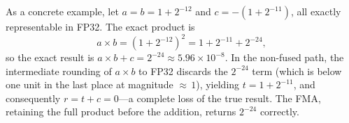 As a concrete example, let $a = b = 1 + 2^{-12}$ and $c = -(1 + 2^{-11})$, all exactly representable in FP32. The exact product is
\[
    a \times b = (1 + 2^{-12})^2 = 1 + 2^{-11} + 2^{-24},
\]
so the exact result is $a \times b + c = 2^{-24} \approx 5.96 \times 10^{-8}$. In the non-fused path, the intermediate rounding of $a \times b$ to FP32 discards the $2^{-24}$ term (which is below one unit in the last place at magnitude ${\approx}\,1$), yielding $t = 1 + 2^{-11}$, and consequently $r = t + c = 0$---a complete loss of the true result. The FMA, retaining the full product before the addition, returns $2^{-24}$ correctly.
